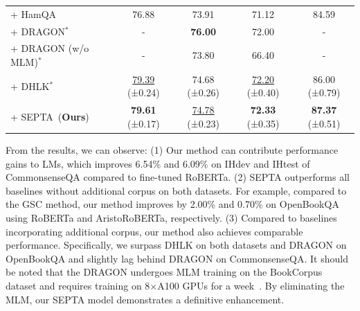 \documentclass[runningheads]{llncs}
\begin{document}
\begin{table}[t!]
{\begin{tabular}{l|cc|cc}
    + HamQA & 76.88 & 73.91 & 71.12 & 84.59 \\
    + DRAGON$^*$ & -     & \textbf{76.00}    & 72.00    & - \\
    + DRAGON (w/o MLM)$^*$ & -     & 73.80  & 66.40  & - \\
    + DHLK$^*$ & \underline{79.39} (±0.24) & 74.68 (±0.26) & \underline{72.20} (±0.40) & 86.00 (±0.79) \\
    \midrule
    + SEPTA~(\textbf{Ours})    & \textbf{79.61} (±0.17) & \underline{74.78} (±0.23) & \textbf{72.33} (±0.35) & \textbf{87.37} (±0.51) \\
    \bottomrule
    \end{tabular}%
    }
  \label{tab:main}%
\end{table}%

From the results, we can observe: (1) Our method can contribute performance gains to LMs, which improves 6.54\% and 6.09\% on IHdev and IHtest of CommonsenseQA compared to fine-tuned RoBERTa. (2) SEPTA outperforms all baselines without additional corpus on both datasets. For example, compared to the GSC method, our method improves by 2.00\% and 0.70\% on OpenBookQA using RoBERTa and AristoRoBERTa, respectively. (3) Compared to baselines incorporating additional corpus, our method also achieves comparable performance. Specifically, we surpass DHLK on both datasets and DRAGON on OpenBookQA and slightly lag behind DRAGON on CommonsenseQA. It should be noted that the DRAGON undergoes MLM training on the BookCorpus dataset and requires training on 8$\times$A100 GPUs for a week~\cite{ref:dragon,ref:dhlk}. By eliminating the MLM, our SEPTA model demonstrates a definitive enhancement.
\end{document}
